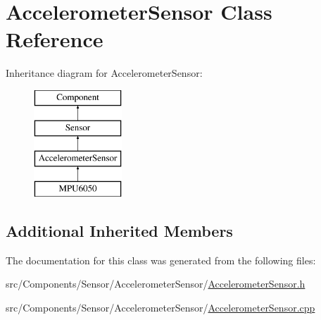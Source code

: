 \hypertarget{classAccelerometerSensor}{}\section{Accelerometer\+Sensor Class Reference}
\label{classAccelerometerSensor}
Inheritance diagram for Accelerometer\+Sensor\+:\begin{figure}[H]
\begin{center}
\leavevmode
\includegraphics[height=4.000000cm]{classAccelerometerSensor}
\end{center}
\end{figure}
\subsection*{Additional Inherited Members}


The documentation for this class was generated from the following files\+:\begin{DoxyCompactItemize}
\item 
src/\+Components/\+Sensor/\+Accelerometer\+Sensor/\hyperlink{AccelerometerSensor_8h}{Accelerometer\+Sensor.\+h}\item 
src/\+Components/\+Sensor/\+Accelerometer\+Sensor/\hyperlink{AccelerometerSensor_8cpp}{Accelerometer\+Sensor.\+cpp}\end{DoxyCompactItemize}
